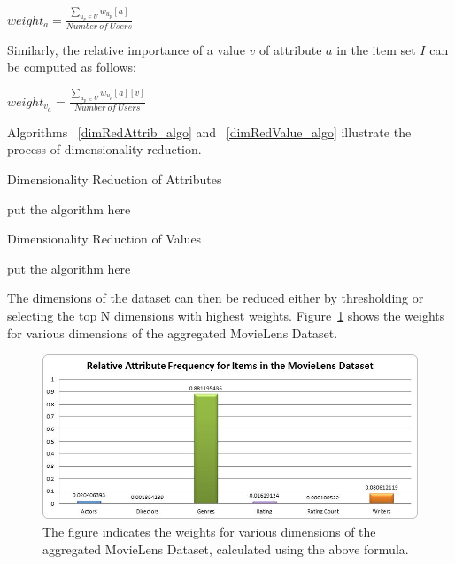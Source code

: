 \documentclass{acm_proc_article-sp}
\begin{document}
$weight_a = \frac{\sum_{u_p \in U} w_{u_p}[a]}{Number\ of\ Users}$

Similarly, the relative importance of a value $v$ of attribute $a$ in the item set $I$ can be computed as follows:

$weight_{v_a} = \frac{\sum_{u_p \in U} w_{u_p}[a][v]}{Number\ of\ Users}$

Algorithms ~\ref{dimRedAttrib_algo} and ~\ref{dimRedValue_algo} illustrate the process of dimensionality reduction.

\begin{algorithm}
\label{dimRedAttrib_algo}
\caption{Dimensionality Reduction of Attributes}
\begin{algorithmic}[1]
  \STATE put the algorithm here
\end{algorithmic}
\end{algorithm}

\begin{algorithm}
\label{dimRedValue_algo}
\caption{Dimensionality Reduction of Values}
\begin{algorithmic}[1]
  \STATE put the algorithm here
\end{algorithmic}
\end{algorithm}

The dimensions of the dataset can then be reduced either by thresholding or selecting the top N dimensions with highest weights. Figure~\ref{attribRelFreq_items} shows the weights for various dimensions of the aggregated MovieLens Dataset.

\begin{figure}[htp]
\centering
\includegraphics[scale=0.4]{Results/attribRelFreq_items.jpg}
\caption{The figure indicates the weights for various dimensions of the aggregated MovieLens Dataset, calculated using the above formula.}
\label{attribRelFreq_items}
\end{figure}

\end{document}
